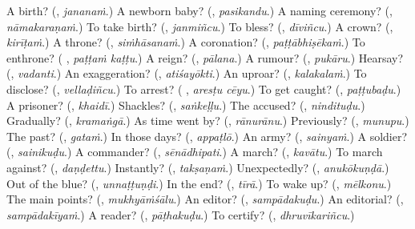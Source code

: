 \begin{tcolorbox}[breakable,colback=teal!4,colframe=teal!35!black,title={Before you move on}]
A birth? (\textbf{}, \emph{jananaṁ}.) A newborn baby? (\textbf{}, \emph{pasikandu}.) A naming ceremony? (\textbf{}, \emph{nāmakaraṇaṁ}.) To take birth? (\textbf{}, \emph{janmiñcu}.) To bless? (\textbf{}, \emph{dīviñcu}.) A crown? (\textbf{}, \emph{kirīṭaṁ}.) A throne? (\textbf{}, \emph{siṁhāsanaṁ}.) A coronation? (\textbf{}, \emph{paṭṭābhiṣēkaṁ}.) To enthrone? (\textbf{ }, \emph{paṭṭaṁ kaṭṭu}.) A reign? (\textbf{}, \emph{pālana}.) A rumour? (\textbf{}, \emph{pukāru}.) Hearsay? (\textbf{}, \emph{vadanti}.) An exaggeration? (\textbf{}, \emph{atiśayōkti}.) An uproar? (\textbf{}, \emph{kalakalaṁ}.) To disclose? (\textbf{}, \emph{vellaḍiñcu}.) To arrest? (\textbf{ }, \emph{aresṭu cēyu}.) To get caught? (\textbf{}, \emph{paṭṭubaḍu}.) A prisoner? (\textbf{}, \emph{khaidī}.) Shackles? (\textbf{}, \emph{saṅkeḷḷu}.) The accused? (\textbf{}, \emph{nindituḍu}.) Gradually? (\textbf{}, \emph{kramaṅgā}.) As time went by? (\textbf{}, \emph{rānurānu}.) Previously? (\textbf{}, \emph{munupu}.) The past? (\textbf{}, \emph{gataṁ}.) In those days? (\textbf{}, \emph{appaṭlō}.) An army? (\textbf{}, \emph{sainyaṁ}.) A soldier? (\textbf{}, \emph{sainikuḍu}.) A commander? (\textbf{}, \emph{sēnādhipati}.) A march? (\textbf{}, \emph{kavātu}.) To march against? (\textbf{}, \emph{daṇḍettu}.) Instantly? (\textbf{}, \emph{takṣaṇaṁ}.) Unexpectedly? (\textbf{}, \emph{anukōkuṇḍā}.) Out of the blue? (\textbf{}, \emph{unnaṭṭuṇḍi}.) In the end? (\textbf{}, \emph{tīrā}.) To wake up? (\textbf{}, \emph{mēlkonu}.) The main points? (\textbf{}, \emph{mukhyāṁśālu}.) An editor? (\textbf{}, \emph{sampādakuḍu}.) An editorial? (\textbf{}, \emph{sampādakīyaṁ}.) A reader? (\textbf{}, \emph{pāṭhakuḍu}.) To certify? (\textbf{}, \emph{dhruvīkariñcu}.)
\end{tcolorbox}
